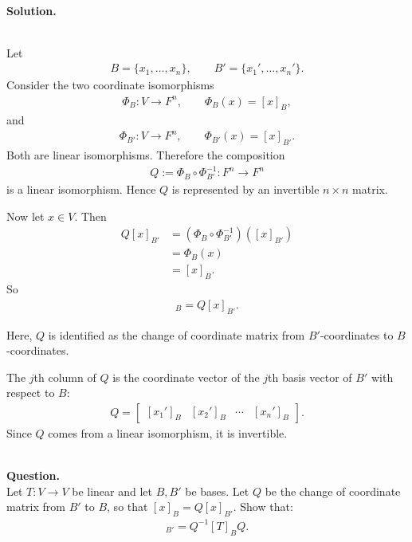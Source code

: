 \documentclass{article}
\begin{document}
\noindent\\
\textbf{Solution.}\\
\quad\\
\begin{mdframed}[linewidth=1pt]
Let
\begin{align*}
B=\{x_1,\dots,x_n\},\qquad B'=\{x_1',\dots,x_n'\}.
\end{align*}
Consider the two coordinate isomorphisms
\begin{align*}
\Phi_B:V\to F^n,\qquad \Phi_B(x)=[x]_B,
\end{align*}
and
\begin{align*}
\Phi_{B'}:V\to F^n,\qquad \Phi_{B'}(x)=[x]_{B'}.
\end{align*}
Both are linear isomorphisms. Therefore the composition
\begin{align*}
Q:=\Phi_{B}\circ \Phi_{B'}^{-1}:F^n\to F^n
\end{align*}
is a linear isomorphism. Hence $Q$ is represented by an invertible $n\times n$ matrix.

Now let $x\in V$. Then
\begin{align*}
Q[x]_{B'}
&=(\Phi_{B}\circ \Phi_{B'}^{-1})([x]_{B'}) \\
&=\Phi_{B}(x) \\
&=[x]_{B}.
\end{align*}
So
\begin{align*}
[x]_{B}=Q[x]_{B'}.
\end{align*}

Here, $Q$ is identified as the change of coordinate matrix from $B'$-coordinates to $B$-coordinates.

The $j$th column of $Q$ is the coordinate vector of the $j$th basis vector of $B'$ with respect to $B$:
\begin{align*}
Q=\begin{bmatrix}
[x_1']_{B} & [x_2']_{B} & \cdots & [x_n']_{B}
\end{bmatrix}.
\end{align*}
Since $Q$ comes from a linear isomorphism, it is invertible.
\end{mdframed}

\bigskip

\hfill \break  $~\!\!$ \dotfill \medskip \\
\textbf{Question.}\\
Let $T: V \to V$ be linear and let $B, B'$ be bases. Let $Q$ be the change of coordinate matrix from $B'$ to $B$, so that $[x]_B = Q[x]_{B'}$. Show that:
\begin{align*}
[T]_{B'} = Q^{-1} [T]_B Q.
\end{align*}
\end{document}
